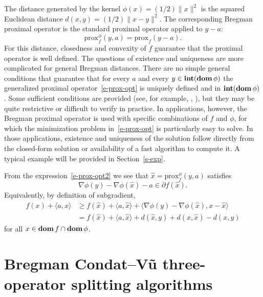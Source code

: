 \documentclass[letterpaper,11pt]{article}
\newcommand{\prox}{\mathrm{prox}}
\newcommand{\dom}{\mathop{\bf dom}}
\newcommand{\intr}{\mathop{\bf int}}
\newcommand{\inprod}[2]{\langle#1, #2\rangle}
\begin{document}
The distance generated by the kernel $\phi(x)=(1/2)\|x\|^2$
is the squared Euclidean distance 
$d(x,y) = (1/2) \|x-y\|^2$.  The corresponding Bregman 
proximal operator is the standard proximal operator applied to $y-a$:
\[
\prox_f^\phi(y,a)=\prox_f(y-a).
\]
For this distance, closedness and convexity of $f$ 
guarantee that the proximal operator is well defined.
The questions of existence and uniqueness are more complicated for 
general Bregman distances. 
There are no simple general conditions that guarantee that for 
every $a$ and every $y \in \intr(\dom \phi)$
the generalized proximal operator~\eqref{e-prox-opt} is uniquely
defined and in $\intr(\dom\phi)$.
Some sufficient conditions are provided
(see, for example, \cite[Section~4.1]{Bubeck15},
\cite[Assumption~A]{BBT17}),
but they may be quite restrictive or difficult to verify in practice.
In applications, however, the Bregman proximal operator is used with 
specific combinations of $f$ and $\phi$, for which the minimization problem
in~\eqref{e-prox-opt} is particularly easy to solve.
In those applications, existence and uniqueness of the solution follow
directly from the closed-form solution or availability
of a fast algorithm to compute it.
A typical example will be provided in Section~\ref{s-exp}.

From the expression~\eqref{e-prox-opt2} we see that 
$\hat x=\prox_f^\phi(y,a)$
satisfies
\[
\nabla \phi(y) - \nabla \phi(\hat x) - a \in \partial f(\hat x).
\]
Equivalently, by definition of subgradient,
\begin{align}
f(x) + \inprod{a}{x}
&\geq f(\hat x)+\inprod{a}{\hat x}
  +\inprod{\nabla\phi(y)-\nabla\phi(\hat x)}{x-\hat x} \nonumber \\
&= f(\hat x)+\inprod{a}{\hat x}+d(\hat x, y)+d(x,\hat x)-d(x,y)
  \label{e-prox-cond}
\end{align}
for all $x\in \dom f \cap \dom \phi$.


\section{Bregman Condat--V\~u three-operator splitting algorithms}
\label{s-bcv}
\end{document}
